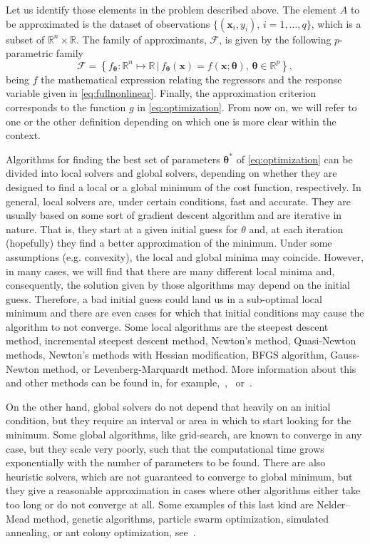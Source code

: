Let us identify those elements in the problem described above. The element $A$ to be approximated is the dataset of observations  $\{(\mathbf{x}_i, y_i),\, i = 1,\ldots,q\}$, which is a subset of $\mathbb{R}^n\times \mathbb{R}$. The family of approximants, $\mathcal{F}$, is given by the following $p$-parametric family
\begin{equation*}
\mathcal{F} = \left\{f_{\boldsymbol{\theta}}:\mathbb{R}^n\longmapsto \mathbb{R}\,|\,
f_{\boldsymbol{\theta}}(\mathbf{x}) = f(\mathbf{x};\boldsymbol{\theta}),\,\boldsymbol{\theta}\in\mathbb{R}^p\right\},
\end{equation*}
being $f$ the mathematical expression relating the regressors and the response variable given in \eqref{eq:fullnonlinear}. Finally, the approximation criterion corresponds to the function $g$ in \eqref{eq:optimization}. From now on, we will refer to one or the other definition depending on which one is more clear within the context.


Algorithms for finding the best set of parameters $\boldsymbol\theta^*$ of \eqref{eq:optimization} can be divided into local solvers and global solvers, depending on whether they are designed to find a local or a global minimum of the cost function, respectively. In general, local solvers are, under certain conditions, fast and accurate. They are usually based on some sort of gradient descent algorithm and are iterative in nature. That is, they start at a given initial guess for $\theta$ and, at each iteration (hopefully) they find a better approximation of the minimum. Under some assumptions (e.g. convexity), the local and global minima may coincide. However, in many cases, we will find that there are many different local minima and, consequently, the solution given by those algorithms may depend on the initial guess. Therefore, a bad initial guess could land us in a sub-optimal local minimum and there are even cases for which that initial conditions may cause the algorithm to not converge. Some local algorithms are the steepest descent method, incremental steepest descent method, Newton’s method, Quasi-Newton methods, Newton’s methods with Hessian modification, BFGS algorithm, Gauss-Newton method, or Levenberg-Marquardt method. More information about this and other methods can be found in, for example,~\citet{nocedal_numerical_optization},~\citet{arora_optimization_algorithms} or~\citet{rhinehart_nonlinear_regression_modeling}.


On the other hand, global solvers do not depend that heavily on an initial condition, but they require an interval or area in which to start looking for the minimum. Some global algorithms, like grid-search, are known to converge in any case, but they scale very poorly, such that the computational time grows exponentially with the number of parameters to be found. There are also heuristic solvers, which are not guaranteed to converge to global minimum, but they give a reasonable approximation in cases where other algorithms either take too long or do not converge at all. Some examples of this last kind are Nelder–Mead method, genetic algorithms, particle swarm optimization, simulated annealing, or ant colony optimization, see~\citet{arora_optimization_algorithms}.


